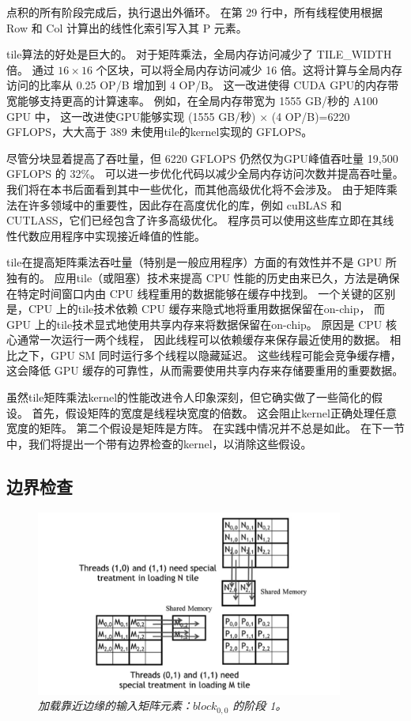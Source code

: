 点积的所有阶段完成后，执行退出外循环。 在第 29 行中，所有线程使用根据 Row 和 Col 计算出的线性化索引写入其 P 元素。

tile算法的好处是巨大的。 对于矩阵乘法，全局内存访问减少了 TILE\_WIDTH 倍。 
通过 $16 \times 16$ 个区块，可以将全局内存访问减少 16 倍。这将计算与全局内存访问的比率从 0.25 OP/B 增加到 4 OP/B。 
这一改进使得 CUDA GPU的内存带宽能够支持更高的计算速率。 
例如，在全局内存带宽为 1555 GB/秒的 A100 GPU 中，
这一改进使GPU能够实现 (1555 GB/秒) × (4 OP/B)=6220 GFLOPS，大大高于 389 未使用tile的kernel实现的 GFLOPS。

尽管分块显着提高了吞吐量，但 6220 GFLOPS 仍然仅为GPU峰值吞吐量 19,500 GFLOPS 的 32\%。 
可以进一步优化代码以减少全局内存访问次数并提高吞吐量。 我们将在本书后面看到其中一些优化，而其他高级优化将不会涉及。 
由于矩阵乘法在许多领域中的重要性，因此存在高度优化的库，例如 cuBLAS 和 CUTLASS，它们已经包含了许多高级优化。 
程序员可以使用这些库立即在其线性代数应用程序中实现接近峰值的性能。

tile在提高矩阵乘法吞吐量（特别是一般应用程序）方面的有效性并不是 GPU 所独有的。 
应用tile（或阻塞）技术来提高 CPU 性能的历史由来已久，方法是确保在特定时间窗口内由 CPU 线程重用的数据能够在缓存中找到。 
一个关键的区别是，CPU 上的tile技术依赖 CPU 缓存来隐式地将重用数据保留在on-chip，
而 GPU 上的tile技术显式地使用共享内存来将数据保留在on-chip。 原因是 CPU 核心通常一次运行一两个线程，
因此线程可以依赖缓存来保存最近使用的数据。 相比之下，GPU SM 同时运行多个线程以隐藏延迟。 
这些线程可能会竞争缓存槽，这会降低 GPU 缓存的可靠性，从而需要使用共享内存来存储要重用的重要数据。

虽然tile矩阵乘法kernel的性能改进令人印象深刻，但它确实做了一些简化的假设。 首先，假设矩阵的宽度是线程块宽度的倍数。 
这会阻止kernel正确处理任意宽度的矩阵。 第二个假设是矩阵是方阵。 在实践中情况并不总是如此。 
在下一节中，我们将提出一个带有边界检查的kernel，以消除这些假设。

\subsection{边界检查}
\begin{figure}[H]
	\centering
	\includegraphics[width=0.9\textwidth]{figs/F5.11.png}
	\caption{\textit{加载靠近边缘的输入矩阵元素：$block_{0,0}$ 的阶段 1。}}
\end{figure}


